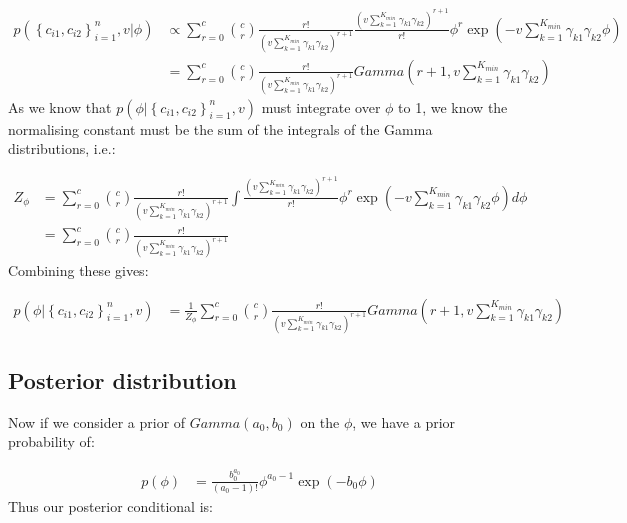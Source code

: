 \documentclass[11pt]{article} %
\begin{document}
\begin{align}
 p(\left\{c_{i1}, c_{i2}\right\}_{i=1}^n, v | \phi) &\propto  \sum_{r=0}^c \binom{c}{r} \frac{r!}{\left(v \sum_{k=1}^{K_{min}} \gamma_{k1} \gamma_{k2}\right)^{r+1}}  \frac{\left(v \sum_{k=1}^{K_{min}} \gamma_{k1} \gamma_{k2}\right)^{r+1}}{r!}\phi^r \exp\left(-v \sum_{k=1}^{K_{min}} \gamma_{k1} \gamma_{k2}\phi\right) \\
&= \sum_{r=0}^c  \binom{c}{r} \frac{r!}{\left(v \sum_{k=1}^{K_{min}} \gamma_{k1} \gamma_{k2}\right)^{r+1}} Gamma\left(r+1, v \sum_{k=1}^{K_{min}} \gamma_{k1} \gamma_{k2} \right)
\end{align}
As we know that $p(\phi | \left\{c_{i1}, c_{i2}\right\}_{i=1}^n, v)$ must integrate over $\phi$ to 1, we know the normalising constant must be the sum of the integrals of the Gamma distributions, i.e.:

\begin{align}
Z_{\phi} &= \sum_{r=0}^c   \binom{c}{r} \frac{r!}{\left(v \sum_{k=1}^{K_{min}} \gamma_{k1} \gamma_{k2}\right)^{r+1}}  \int\frac{\left(v \sum_{k=1}^{K_{min}} \gamma_{k1} \gamma_{k2}\right)^{r+1}}{r!}\phi^r \exp\left(-v \sum_{k=1}^{K_{min}} \gamma_{k1} \gamma_{k2}\phi\right) d\phi \\
&= \sum_{r=0}^c  \binom{c}{r} \frac{r!}{\left(v \sum_{k=1}^{K_{min}} \gamma_{k1} \gamma_{k2}\right)^{r+1}}  \label{Z_phi}
\end{align}
Combining these gives:

\begin{align}
p(\phi | \left\{c_{i1}, c_{i2}\right\}_{i=1}^n, v) &= \frac{1}{Z_{\phi}}  \sum_{r=0}^c  \binom{c}{r} \frac{r!}{\left(v \sum_{k=1}^{K_{min}} \gamma_{k1} \gamma_{k2}\right)^{r+1}} Gamma\left(r+1, v \sum_{k=1}^{K_{min}} \gamma_{k1} \gamma_{k2} \right)
\end{align}

\subsection{Posterior distribution}

Now if we consider a prior of $Gamma(a_0, b_0)$ on the $\phi$, we have a prior probability of:

\begin{align}
p(\phi) &= \frac{b_0^{a_0}}{(a_0 - 1)!}\phi^{a_0 - 1}\exp\left(-b_0 \phi \right)
\end{align}
Thus our posterior conditional is:

\end{document}
